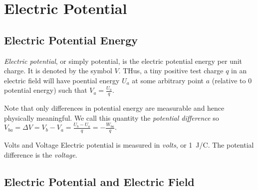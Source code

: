 \chapter{Electric Potential}

\section{Electric Potential Energy}

\begin{definition}
  \emph{Electric potential}, or simply potential, is the electric potential energy per unit charge. It is denoted by the symbol $V$. THus, a tiny positive test charge $q$ in an electric field will have poential energy $U_a$ at some arbitrary point $a$ (relative to 0 potential energy) such that $V_a = \frac{U_a}{q}.$
\end{definition}
\begin{remark}
    Note that only differences in potential energy are measurable and hence physically meaningful. We call this quantity the \emph{potential difference} so $V_{ba} = \Delta V = V_b - V_a = \frac{U_b - U_a}{q} = -\frac{W_{ba}}{q}.$
\end{remark}
\begin{note}{Volts and Voltage}
    Electric potential is measured in \emph{volts}, or \qty{1}{J/C}. The potential difference is the \emph{voltage}.
\end{note}

\section{Electric Potential and Electric Field}

